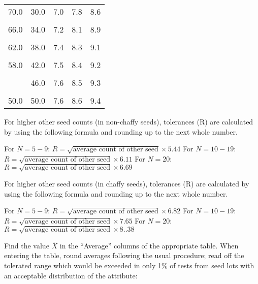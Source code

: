 \documentclass[
]{book}
\begin{document}
\begin{longtable}[t]{rrrrr}
70.0 & 30.0 & 7.0 & 7.8 & 8.6\\
\cellcolor{gray!6}{68.0} & \cellcolor{gray!6}{32.0} & \cellcolor{gray!6}{7.1} & \cellcolor{gray!6}{8.0} & \cellcolor{gray!6}{8.7}\\
66.0 & 34.0 & 7.2 & 8.1 & 8.9\\
\addlinespace
\cellcolor{gray!6}{64.0} & \cellcolor{gray!6}{36.0} & \cellcolor{gray!6}{7.3} & \cellcolor{gray!6}{8.2} & \cellcolor{gray!6}{9.0}\\
62.0 & 38.0 & 7.4 & 8.3 & 9.1\\
\cellcolor{gray!6}{60.0} & \cellcolor{gray!6}{40.0} & \cellcolor{gray!6}{7.5} & \cellcolor{gray!6}{8.4} & \cellcolor{gray!6}{9.2}\\
58.0 & 42.0 & 7.5 & 8.4 & 9.2\\
\cellcolor{gray!6}{56.0} & \cellcolor{gray!6}{44.0} & \cellcolor{gray!6}{7.6} & \cellcolor{gray!6}{8.5} & \cellcolor{gray!6}{9.3}\\
\addlinespace
54.0 & 46.0 & 7.6 & 8.5 & 9.3\\
\cellcolor{gray!6}{52.0} & \cellcolor{gray!6}{48.0} & \cellcolor{gray!6}{7.6} & \cellcolor{gray!6}{8.6} & \cellcolor{gray!6}{9.4}\\
50.0 & 50.0 & 7.6 & 8.6 & 9.4\\
\bottomrule
\end{longtable}

For higher other seed counts (in non-chaffy seeds), tolerances (R) are calculated by using the following formula and rounding up to the next whole number.

For \(N = 5-9\): \(R = \sqrt{\textrm{average count of other seed}} \times 5.44\)
For \(N = 10-19\): \(R = \sqrt{\textrm{average count of other seed}} \times 6.11\)
For \(N = 20\): \(R = \sqrt{\textrm{average count of other seed}} \times 6.69\)

For higher other seed counts (in chaffy seeds), tolerances (R) are calculated by using the following formula and rounding up to the next whole number.

For \(N = 5-9\): \(R = \sqrt{\textrm{average count of other seed}} \times 6.82\)
For \(N = 10-19\): \(R = \sqrt{\textrm{average count of other seed}} \times 7.65\)
For \(N = 20\): \(R = \sqrt{\textrm{average count of other seed}} \times 8..38\)

Find the value \(\bar{X}\) in the ``Average'' columns of the appropriate table. When entering the table, round averages following the usual procedure; read off the tolerated range which would be exceeded in only 1\% of tests from seed lots with an acceptable distribution of the attribute:
\end{document}
